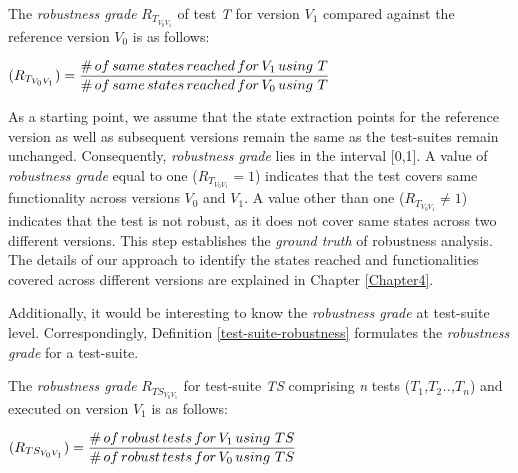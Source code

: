 \theoremstyle{definition}

\begin{definition}{The \textit{robustness grade} $R_{T_{V_{0}V_{1}}}$ of test \textit{T} for version \textit{$V_{1}$} compared against the reference version \textit{$V_{0}$} is as follows:}
\begin{center}
\vspace{0.5cm}
$(R_{T_{V_{0}V_{1}}}) = \displaystyle \frac{\#\thinspace of \thinspace same \thinspace states \thinspace reached \thinspace for \thinspace V_{1} \thinspace using \thinspace \thinspace T}{\# \thinspace of \thinspace same \thinspace states \thinspace reached  \thinspace for \thinspace V_{0} \thinspace using \thinspace \thinspace T}$ \normalsize
\end{center}
\label{test-case-robustness} 
\end{definition} 

As a starting point, we assume that the state extraction points for the reference version as well as subsequent versions remain the same as the test-suites remain unchanged. Consequently, \textit{
robustness grade} lies in the interval [0,1]. A value of \textit{
robustness grade} equal to one ($R_{T_{V_{0}V_{1}}}=1$) indicates that the test covers same functionality across versions \textit{$V_{0}$} and \textit{$V_{1}$}. A value other than one ($R_{T_{V_{0}V_{1}}}\neq 1$) indicates that the test is not robust, as it does not cover same states across two different versions. This step establishes the \textit{ground truth} of robustness analysis. The details of our approach to identify the states reached and functionalities covered across different versions are explained in Chapter \ref{Chapter4}.

Additionally, it would be interesting to know the \textit{
robustness grade} at test-suite level. Correspondingly, Definition \ref{test-suite-robustness} formulates the \textit{
robustness grade} for a test-suite.

\theoremstyle{definition}
\begin{definition}{The \textit{robustness grade} $R_{TS_{V_{0}V_{1}}}$ for test-suite \textit{TS} comprising \textit{n} tests (\textit{$T_1$,$T_2$..,$T_n$}) and executed on version \textit{$V_{1}$} is as follows:}
\vspace{0.5cm}
\begin{center}
$(R_{TS_{V_{0}V_{1}}}) = \displaystyle \frac{\#\thinspace of \thinspace robust \thinspace tests \thinspace for \thinspace V_{1} \thinspace using \thinspace \thinspace TS}{\# \thinspace of \thinspace robust \thinspace tests \thinspace for  \thinspace V_{0} \thinspace using \thinspace \thinspace TS}$ \normalsize
\end{center}
\label{test-suite-robustness}
\end{definition}

